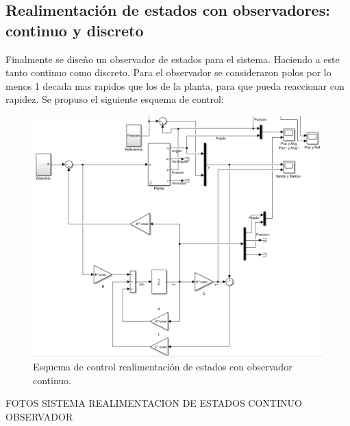  \subsection{Realimentaci\'on de estados con observadores: continuo y discreto}
Finalmente se diseño un observador de estados  para el sistema. Haciendo a este tanto continuo como discreto.
Para el observador se consideraron polos por lo menos 1 decada mas rapidos que los de la planta, para que pueda reaccionar con rapidez.
Se propuso el siguiente esquema de control:
\begin{figure}[H]
	\centering
	\includegraphics[width=1\linewidth]{Imagenes/Esquema_general_obs.png}
	\caption{Esquema de control realimentación de estados con observador continuo.}
	\label{esqcontobs}
\end{figure}

FOTOS SISTEMA REALIMENTACION DE ESTADOS CONTINUO OBSERVADOR

